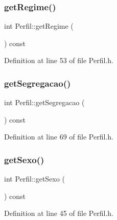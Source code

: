 \hypertarget{class_perfil_ab01922cd35d36b06d408956865650ab6}{}\label{class_perfil_ab01922cd35d36b06d408956865650ab6} 
\subsubsection{\texorpdfstring{get\+Regime()}{getRegime()}}
{\footnotesize\ttfamily int Perfil\+::get\+Regime (\begin{DoxyParamCaption}{ }\end{DoxyParamCaption}) const\hspace{0.3cm}{\ttfamily [inline]}}



Definition at line 53 of file Perfil.\+h.

\hypertarget{class_perfil_a4ffc0651290f190979139cd06cf635ac}{}\label{class_perfil_a4ffc0651290f190979139cd06cf635ac} 
\subsubsection{\texorpdfstring{get\+Segregacao()}{getSegregacao()}}
{\footnotesize\ttfamily int Perfil\+::get\+Segregacao (\begin{DoxyParamCaption}{ }\end{DoxyParamCaption}) const\hspace{0.3cm}{\ttfamily [inline]}}



Definition at line 69 of file Perfil.\+h.

\hypertarget{class_perfil_a67a0adbb4f1364c53e10c096b6ae6fc4}{}\label{class_perfil_a67a0adbb4f1364c53e10c096b6ae6fc4} 
\subsubsection{\texorpdfstring{get\+Sexo()}{getSexo()}}
{\footnotesize\ttfamily int Perfil\+::get\+Sexo (\begin{DoxyParamCaption}{ }\end{DoxyParamCaption}) const\hspace{0.3cm}{\ttfamily [inline]}}



Definition at line 45 of file Perfil.\+h.

